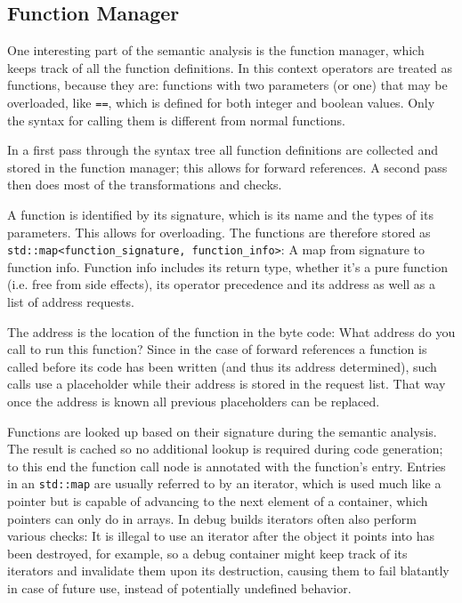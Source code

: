 		\subsection{Function Manager}
			
			One interesting part of the semantic analysis is the function manager, which keeps track of all the function definitions. In this context operators are treated as functions, because they are: functions with two parameters (or one) that may be overloaded, like \lstinline$==$, which is defined for both integer and boolean values. Only the syntax for calling them is different from normal functions.
			
			In a first pass through the syntax tree all function definitions are collected and stored in the function manager; this allows for forward references. A second pass then does most of the transformations and checks.
			
			A function is identified by its signature, which is its name and the types of its parameters. This allows for overloading. The functions are therefore stored as \lstinline$std::map<function_signature, function_info>$: A map from signature to function info. Function info includes its return type, whether it's a pure function (i.e. free from side effects), its operator precedence and its address as well as a list of address requests.
			
			The address is the location of the function in the byte code: What address do you call to run this function? Since in the case of forward references a function is called before its code has been written (and thus its address determined), such calls use a placeholder while their address is stored in the request list. That way once the address is known all previous placeholders can be replaced.
			
			Functions are looked up based on their signature during the semantic analysis. The result is cached so no additional lookup is required during code generation; to this end the function call node is annotated with the function's entry. Entries in an \lstinline$std::map$ are usually referred to by an iterator, which is used much like a pointer but is capable of advancing to the next element of a container, which pointers can only do in arrays. In debug builds iterators often also perform various checks: It is illegal to use an iterator after the object it points into has been destroyed, for example, so a debug container might keep track of its iterators and invalidate them upon its destruction, causing them to fail blatantly in case of future use, instead of potentially undefined behavior.
			
